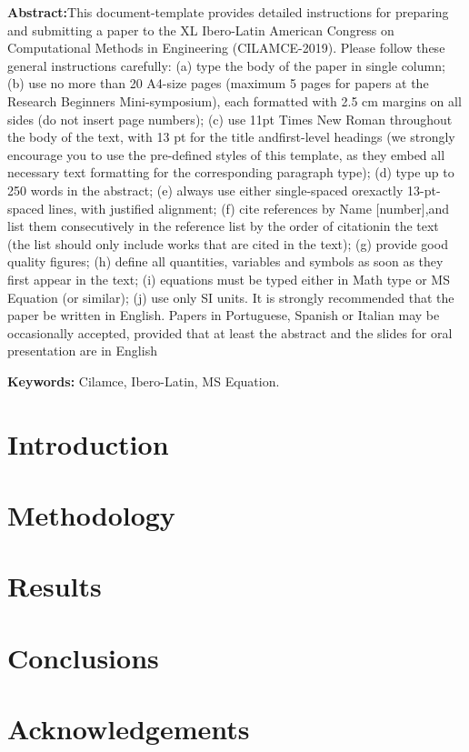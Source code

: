 \documentclass{cilamce19}
\begin{document}
\begin{titlepage}
\textbf{Abstract:}This document-template provides detailed instructions for preparing and submitting a paper to the XL Ibero-Latin American Congress on Computational Methods in Engineering (CILAMCE-2019). Please follow these general instructions carefully: (a) type the body of the paper in single column; (b) use no more than 20 A4-size pages (maximum 5 pages for papers at the Research Beginners Mini-symposium), each formatted with 2.5 cm margins on all sides (do not insert page numbers); (c) use 11pt Times New Roman throughout the body of the text, with 13 pt for the title andfirst-level headings (we strongly encourage you to use the pre-defined styles of this template, as they embed all necessary text formatting for the corresponding paragraph type); (d) type up to 250 words in the abstract; (e) always use either single-spaced orexactly 13-pt-spaced lines, with justified alignment; (f) cite references by Name [number],and list them consecutively in the reference list by the order of citationin the text (the list should only include works that are cited in the text); (g) provide good quality figures; (h) define all quantities, variables and symbols as soon as they first appear in the text; (i) equations must be typed either in Math type or MS Equation (or similar); (j) use only SI units. It is strongly recommended that the paper be written in English. Papers in Portuguese, Spanish or Italian may be occasionally accepted, provided that at least the abstract and the slides for oral presentation are in English

\textbf{Keywords:} Cilamce, Ibero-Latin, MS Equation.
\end{titlepage}




\section{Introduction}
   \lipsum[1]
   \citet{book-example}


\section{Methodology}

 \lipsum[2-4]\citet{article-example}


\section{Results}
\lipsum[6-7]\citet{inbook-example}

\section{Conclusions}
\lipsum[8-11]

\section{Acknowledgements}
\lipsum[12]

%
  
  
\end{document}
